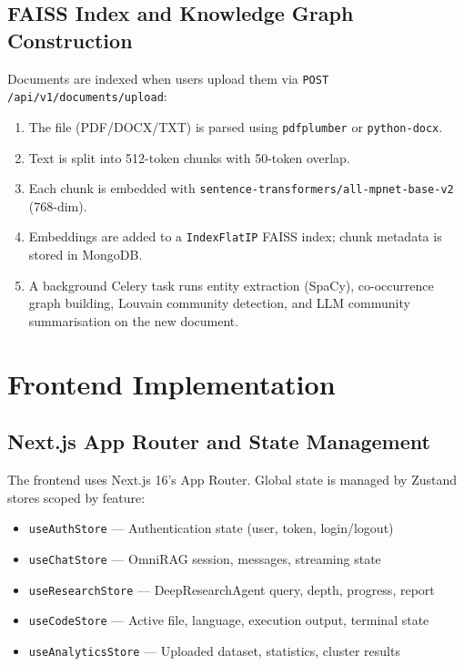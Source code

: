 \subsection{FAISS Index and Knowledge Graph Construction}
\label{subsec:faiss-impl}

Documents are indexed when users upload them via \texttt{POST /api/v1/documents/upload}:

\begin{enumerate}
    \item The file (PDF/DOCX/TXT) is parsed using \texttt{pdfplumber} or \texttt{python-docx}.
    \item Text is split into 512-token chunks with 50-token overlap.
    \item Each chunk is embedded with \texttt{sentence-transformers/all-mpnet-base-v2} (768-dim).
    \item Embeddings are added to a \texttt{IndexFlatIP} FAISS index; chunk metadata is stored in MongoDB.
    \item A background Celery task runs entity extraction (SpaCy), co-occurrence graph building, Louvain community detection, and LLM community summarisation on the new document.
\end{enumerate}

\section{Frontend Implementation}
\label{sec:frontend-impl}

\subsection{Next.js App Router and State Management}
\label{subsec:nextjs-structure}

The frontend uses Next.js 16's App Router. Global state is managed by Zustand stores scoped by feature:

\begin{itemize}
    \item \texttt{useAuthStore} --- Authentication state (user, token, login/logout)
    \item \texttt{useChatStore} --- OmniRAG session, messages, streaming state
    \item \texttt{useResearchStore} --- DeepResearchAgent query, depth, progress, report
    \item \texttt{useCodeStore} --- Active file, language, execution output, terminal state
    \item \texttt{useAnalyticsStore} --- Uploaded dataset, statistics, cluster results
\end{itemize}


